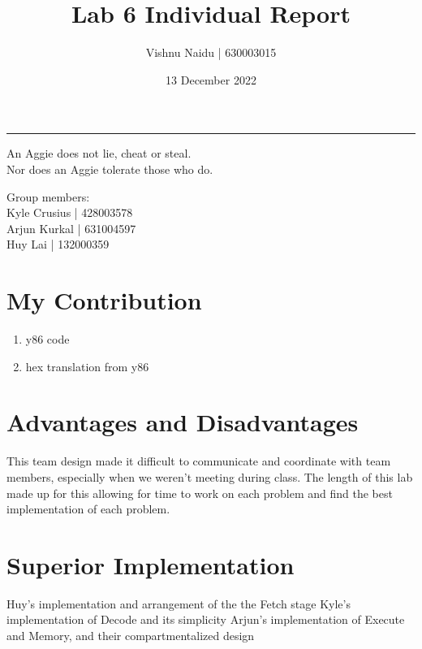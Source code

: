 \documentclass[fleqn,12pt]{article}
\title{\vspace{-2.5cm}Lab 6 Individual Report}
\author{
    Vishnu Naidu | 630003015
}
\affil{Texas A\&M University}
\date{\vspace{-28pt}13 December 2022}
\begin{document}
\maketitle
\begin{center}
\vspace{-42pt}
\rule{\textwidth}{.1pt}
{\large
An Aggie does not lie, cheat or steal.\\
Nor does an Aggie tolerate those who do.
}
\end{center}
\begin{center}
Group members:\\
Kyle Crusius | 428003578\\
Arjun Kurkal | 631004597\\
Huy Lai | 132000359
\end{center}

\section*{My Contribution}
\begin{enumerate}
    \item y86 code 
    \item hex translation from y86
\end{enumerate}

\section*{Advantages and Disadvantages}
\noindent
This team design made it difficult to communicate and coordinate with team members, especially when we weren't meeting during class. The length of this lab made up for this allowing for time to work on each problem and find the best implementation of each problem. 

\section*{Superior Implementation}
\noindent
Huy's implementation and arrangement of the the Fetch stage 
Kyle's implementation of Decode and its simplicity
Arjun's implementation of Execute and Memory, and their compartmentalized design
\end{document}
